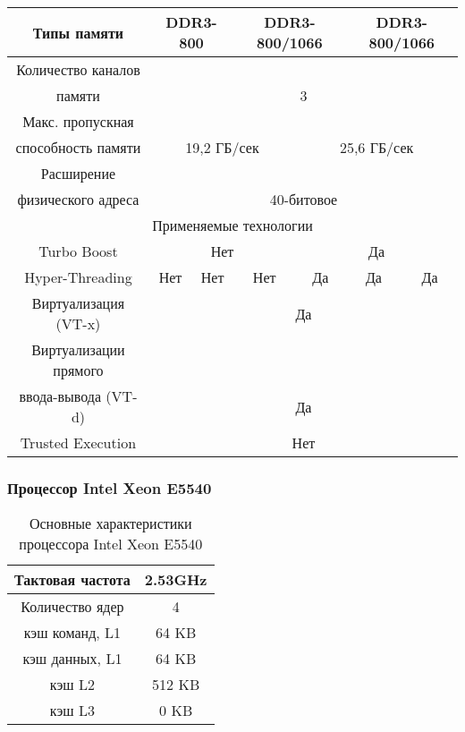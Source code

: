 \begin{center}
\begin{table}[ht]
\begin{tabular}{|c|c|c|c|c|c|c|}
		Типы памяти & \multicolumn{2}{c|}{DDR3-800} & \multicolumn{2}{c|}{DDR3-800/1066} & \multicolumn{2}{c|}{DDR3-800/1066} \\ \hline
		Количество каналов & \multicolumn{6}{c|}{} \\
		памяти & \multicolumn{6}{c|}{3} \\ \hline
		Макс. пропускная & \multicolumn{6}{c|}{} \\ \hline
		способность памяти & \multicolumn{3}{c|}{19,2 ГБ/сек} & \multicolumn{3}{c|}{25,6 ГБ/сек }\\ \hline
		Расширение         & \multicolumn{6}{c|}{} \\ 
		физического адреса & \multicolumn{6}{c|}{40-битовое} \\ \hline
		\multicolumn{7}{|c|}{Применяемые технологии} \\ \hline
		Turbo Boost & \multicolumn{3}{c|}{Нет} & \multicolumn{3}{c|}{Да} \\ \hline
		Hyper-Threading & Нет & Нет & Нет & Да & Да & Да \\ \hline
		Виртуализация (VT-x) & \multicolumn{6}{c|}{Да} \\ \hline
		Виртуализации прямого & \multicolumn{6}{c|}{} \\
		ввода-вывода (VT-d)   & \multicolumn{6}{c|}{ Да} \\ \hline
		Trusted Execution &   \multicolumn{6}{c|}{ Нет} \\ \hline
	\end{tabular}
\end{table}
\end{center}

\clearpage



\subsubsection{Процессор Intel Xeon  E5540}
\label{app_E5540}


\begin{table}[ht]
\begin{center}
\caption{Основные характеристики процессора Intel Xeon  E5540}
\begin{tabular}{|c|c|}
\hline	
Тактовая частота & 2.53GHz   \\ \hline
Количество ядер & 4 	     \\ \hline
кэш команд, L1 &  64 KB      \\ \hline
кэш данных, L1 &  64 KB       \\ \hline
кэш L2         &  512 KB      \\ \hline
кэш L3         &  0 KB        \\ \hline
\end{tabular}
\end{center} 	
\end{table} 	

